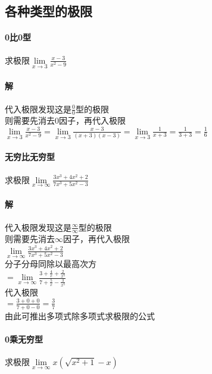 \documentclass{article}
\begin{document}
\begin{flushleft}
	
	\section{各种类型的极限}
	
	\paragraph{0比0型}
	求极限$\lim\limits_{x\to 3}\frac{x-3}{x^2-9}$
	\paragraph{解}
	代入极限发现这是$\frac{0}{0}$型的极限\\
	则需要先消去$0$因子，再代入极限\\
	$\lim\limits_{x\to 3}\frac{x-3}{x^2-9}=\lim\limits_{x\to 3}\frac{x-3}{(x+3)(x-3)}=\lim\limits_{x\to 3}\frac{1}{x+3}=\frac{1}{3+3}=\frac{1}{6}$\\
	

	\paragraph{无穷比无穷型}
	求极限$\lim\limits_{x\to \infty}\frac{3x^3+4x^2+2}{7x^3+5x^2-3}$
	\paragraph{解}
	代入极限发现这是$\frac{\infty}{\infty}$型的极限\\
	则需要先消去$\infty$因子，再代入极限\\
	$\lim\limits_{x\to \infty}\frac{3x^3+4x^2+2}{7x^3+5x^2-3}$\\
	分子分母同除以最高次方\\
	$=\lim\limits_{x\to \infty}\frac{3+\frac{4}{x}+\frac{2}{x^3}}{7+\frac{5}{x}-\frac{3}{x^3}}$\\
	代入极限\\
	$=\frac{3+0+0}{7+0-0}=\frac{3}{7}$\\
	由此可推出多项式除多项式求极限的公式\\
	
	\paragraph{0乘无穷型}
	求极限$\lim\limits_{x\to \infty}x(\sqrt{x^2+1}-x)$

\end{flushleft}
\end{document}
